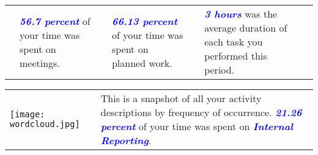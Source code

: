\documentclass[a4paper]{article}
\begin{document}
\begin{table}[h!]
     \begin{center}
     \begin{tabular}{m{0.5cm} m{4cm} m{0.5cm} m{4cm} m{0.5cm} m{4cm} m{0.5cm}}
         \begin {minipage} {0.5cm}
     \end{minipage}
      &
     \begin {minipage} {4cm}
     \Large{\textbf{\textcolor{blue}{\emph{56.7 percent}}} of your time was spent on meetings.}
     \end{minipage}
      &
      \begin {minipage} {0.5cm}
     \end{minipage}
      &
     \begin {minipage} {4cm}
     \Large{\textbf{\textcolor{blue}{\emph{66.13 percent}}} of your time was spent on planned work.}
     \end{minipage}
     &
    \begin {minipage} {0.5cm}
     \end{minipage}
      &
     \begin {minipage} {4cm}
     \Large{\textbf{\textcolor{blue}{\emph{3 hours}}} was the average duration of each task you performed this period.}
     \end{minipage}
     &
    \begin {minipage} {0.5cm}
     \end{minipage}
      \end{tabular}
      \end{center}
      \end{table}

\begin{table}[h!]
     \begin{center}
     \begin{tabular}{m{8cm} m{8cm}}
     \begin {minipage} {8cm}
     \texttt{[image: wordcloud.jpg]}
     \end{minipage}
      & 
      \begin{minipage}{8cm}
      \Large{This is a snapshot of all your activity descriptions by frequency of occurrence. \textbf{\textcolor{blue}{\emph{21.26 percent}}} of your time was spent on \textbf{\textcolor{blue}{\emph{Internal Reporting}}}.}
      \end{minipage}
      \end{tabular}
      \end{center}
      \end{table}
\end{document}
